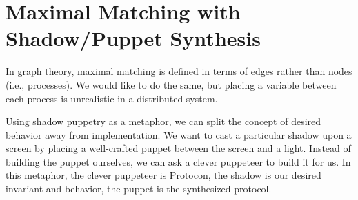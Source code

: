 \section{Maximal Matching with Shadow/Puppet Synthesis}

In graph theory, maximal matching is defined in terms of edges rather than nodes (i.e., processes).
We would like to do the same, but placing a variable between each process is unrealistic in a distributed system.

Using shadow puppetry as a metaphor, we can split the concept of desired behavior away from implementation.
We want to cast a particular shadow upon a screen by placing a well-crafted puppet between the screen and a light.
Instead of building the puppet ourselves, we can ask a clever puppeteer to build it for us.
In this metaphor, the clever puppeteer is Protocon, the shadow is our desired invariant and behavior, the puppet is the synthesized protocol.

